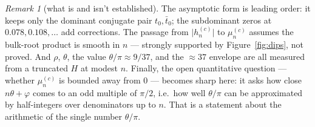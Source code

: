 \documentclass[11pt, fleqn]{amsart}
\theoremstyle{remark}
\newtheorem{remark}{Remark}
\begin{document}
\begin{remark}[what is and isn't established]
The asymptotic form is leading order: it keeps only the dominant conjugate pair $t_0,\bar
t_0$; the subdominant zeros at $0.078,0.108,\dots$ add corrections. The passage from
$\bigl|h_n^{(c)}\bigr|$ to $\mu_n^{(c)}$ assumes the bulk-root product is smooth in $n$ ---
strongly supported by Figure~\ref{fig:dips}, not proved. And $\rho$, $\theta$, the value
$\theta/\pi\approx9/37$, and the $\approx37$ envelope are all measured from a truncated $H$
at modest $n$. Finally, the open quantitative question --- whether $\mu_n^{(c)}$ is bounded
away from $0$ --- becomes sharp here: it asks how close $n\theta+\varphi$ comes to an odd
multiple of $\pi/2$, i.e.\ how well $\theta/\pi$ can be approximated by half-integers over
denominators up to $n$. That is a statement about the arithmetic of the single number
$\theta/\pi$.
\end{remark}
\end{document}

